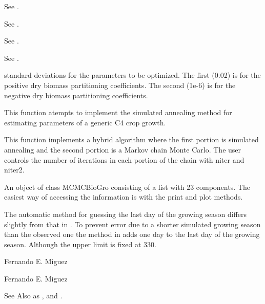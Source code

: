 \documentclass[letterpaper]{book}
\begin{document}
\begin{Arguments}
\begin{ldescription}
\item[\code{phenoControl}] See .

\item[\code{soilControl}] See .

\item[\code{nitroControl}] See .

\item[\code{centuryControl}] See .

\item[\code{sd}] standard deviations for the parameters to be
optimized. The first (0.02) is for the positive dry
biomass partitioning coefficients. The second (1e-6) is
for the negative dry biomass partitioning coefficients.
\end{ldescription}
\end{Arguments}
%
\begin{Details}\relax
This function atempts to implement the simulated annealing
method for estimating parameters of a generic C4 crop
growth.

This function implements a hybrid algorithm where the first
portion is simulated annealing and the second portion is a
Markov chain Monte Carlo. The user controls the number of
iterations in each portion of the chain with niter and
niter2.
\end{Details}
%
\begin{Value}
An object of class MCMCBioGro consisting of a list with 23
components.  The easiest way of accessing the information
is with the print and plot methods.
\end{Value}
%
\begin{Note}\relax
The automatic method for guessing the last day of the
growing season differs slightly from that in .
To prevent error due to a shorter simulated growing season
than the observed one the method in  adds
one day to the last day of the growing season. Although the
upper limit is fixed at 330.
\end{Note}
%
\begin{Author}\relax
Fernando E. Miguez

Fernando E. Miguez
\end{Author}
%
\begin{SeeAlso}\relax
See Also as , 
and .
\end{SeeAlso}
\end{document}
